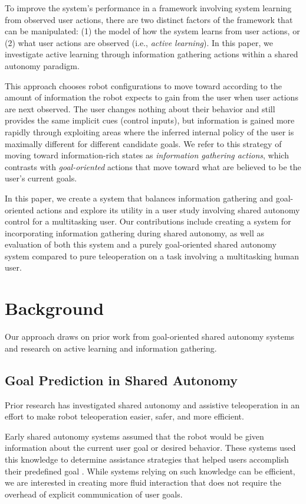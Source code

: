 \documentclass[conference]{IEEEtran}
\begin{document}
To improve the system's performance in a framework involving system learning from observed user actions, there are two distinct factors of the framework that can be manipulated: (1) the model of how the system learns from user actions, or (2) what user actions are observed (i.e., \textit{active learning}). In this paper, we investigate active learning through information gathering actions within a shared autonomy paradigm.

This approach chooses robot configurations to move toward according to the amount of information the robot expects to gain from the user when user actions are next observed. The user changes nothing about their behavior and still provides the same implicit cues (control inputs), but information is gained more rapidly through exploiting areas where the inferred internal policy of the user is maximally different for different candidate goals. We refer to this strategy of moving toward information-rich states as \textit{information gathering actions}, which contrasts with \textit{goal-oriented} actions that move toward what are believed to be the user's current goals.

In this paper, we create a system that balances information gathering and goal-oriented actions and explore its utility in a user study involving shared autonomy control for a multitasking user. Our contributions include creating a system for incorporating information gathering during shared autonomy, as well as evaluation of both this system and a purely goal-oriented shared autonomy system compared to pure teleoperation on a task involving a multitasking human user.

\section{Background}

Our approach draws on prior work from goal-oriented shared autonomy systems and research on active learning and information gathering.

\subsection{Goal Prediction in Shared Autonomy}

Prior research has investigated shared autonomy and assistive teleoperation in an effort to make robot teleoperation easier, safer, and more efficient.

Early shared autonomy systems assumed that the robot would be given information about the current user goal or desired behavior. These systems used this knowledge to determine assistance strategies that helped users accomplish their predefined goal \cite{aigner1997human, debus2001cooperative, goodrich2001experiments}. While systems relying on such knowledge can be efficient, we are interested in creating more fluid interaction that does not require the overhead of explicit communication of user goals.
\end{document}
